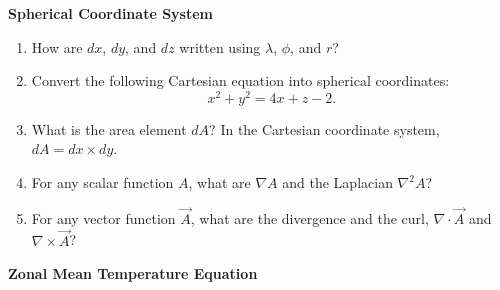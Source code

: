 \documentclass[11pt,a4paper]{article}
\begin{document}


\noindent\textbf{Spherical Coordinate System}

\begin{enumerate}[label=(\arabic*)]
    \item How are $dx$, $dy$, and $dz$ written using $\lambda$, $\phi$, and $r$?
    \begin{solution}

    \end{solution}

    \item Convert the following Cartesian equation into spherical coordinates:
    \[
        x^2 + y^2 = 4x + z - 2.
    \]
    \begin{solution}

    \end{solution}

    \item What is the area element $dA$? In the Cartesian coordinate system, $dA = dx \times dy$.
    \begin{solution}

    \end{solution}

    \item For any scalar function $A$, what are $\nabla A$ and the Laplacian $\nabla^2 A$?
    \begin{solution}

    \end{solution}

    \item For any vector function $\vec{A}$, what are the divergence and the curl, $\nabla\cdot\vec{A}$ and $\nabla\times\vec{A}$?
    \begin{solution}

    \end{solution}
\end{enumerate}

\newpage
\noindent\textbf{Zonal Mean Temperature Equation}
\end{document}
